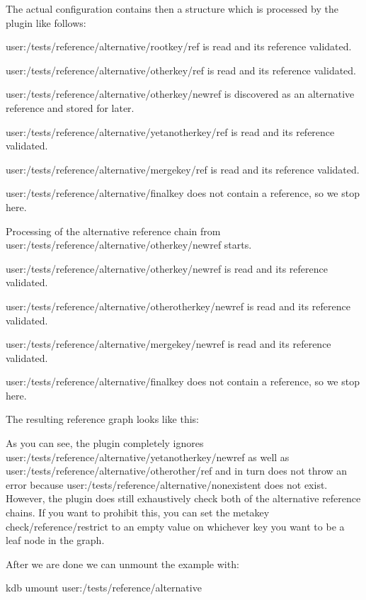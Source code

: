 The actual configuration contains then a structure which is processed by the plugin like follows\+:


\begin{DoxyEnumerate}
\item {\ttfamily user\+:/tests/reference/alternative/rootkey/ref} is read and its reference validated.
\item {\ttfamily user\+:/tests/reference/alternative/otherkey/ref} is read and its reference validated.
\item {\ttfamily user\+:/tests/reference/alternative/otherkey/newref} is discovered as an alternative reference and stored for later.
\item {\ttfamily user\+:/tests/reference/alternative/yetanotherkey/ref} is read and its reference validated.
\item {\ttfamily user\+:/tests/reference/alternative/mergekey/ref} is read and its reference validated.
\item {\ttfamily user\+:/tests/reference/alternative/finalkey} does not contain a reference, so we stop here.
\item Processing of the alternative reference chain from {\ttfamily user\+:/tests/reference/alternative/otherkey/newref} starts.
\item {\ttfamily user\+:/tests/reference/alternative/otherkey/newref} is read and its reference validated.
\item {\ttfamily user\+:/tests/reference/alternative/otherotherkey/newref} is read and its reference validated.
\item {\ttfamily user\+:/tests/reference/alternative/mergekey/newref} is read and its reference validated.
\item {\ttfamily user\+:/tests/reference/alternative/finalkey} does not contain a reference, so we stop here.
\end{DoxyEnumerate}

The resulting reference graph looks like this\+:



As you can see, the plugin completely ignores {\ttfamily user\+:/tests/reference/alternative/yetanotherkey/newref} as well as {\ttfamily user\+:/tests/reference/alternative/otherother/ref} and in turn does not throw an error because {\ttfamily user\+:/tests/reference/alternative/nonexistent} does not exist. However, the plugin does still exhaustively check both of the alternative reference chains. If you want to prohibit this, you can set the metakey {\ttfamily check/reference/restrict} to an empty value on whichever key you want to be a leaf node in the graph.

After we are done we can unmount the example with\+:


\begin{DoxyCode}
kdb umount user:/tests/reference/alternative
\end{DoxyCode}
 